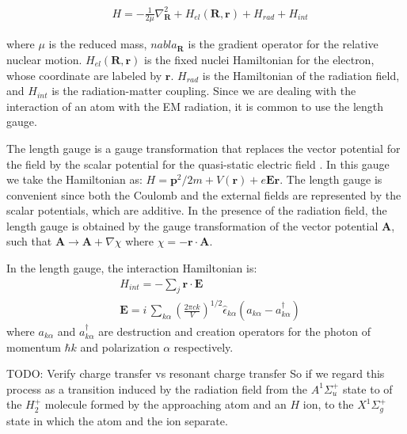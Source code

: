 \begin{equation}\label{eqH} 
\begin{split} 
& H = -\frac{1}{2\mu}\nabla^2_{\mathbf{R}} + H_{el}(\mathbf{R},\mathbf{r}) + H_{rad} + H_{int} 
\end{split} 
\end{equation} 

where $ \mu $ is the reduced mass, $ nabla_{\mathbf{R}} $ is the gradient operator for the relative nuclear motion. $ H_{el}(\mathbf{R},\mathbf{r}) $ is the fixed nuclei Hamiltonian for the electron, whose coordinate are labeled by $ \mathbf{r} $. $ H_{rad} $ is the Hamiltonian of the radiation field, and $ H_{int} $ is the radiation-matter coupling. Since we are dealing with the interaction of an atom with the EM radiation, it is common to use the length gauge.  

The length gauge is a gauge transformation that replaces the vector potential for the field by the scalar potential for the quasi-static electric field \cite{LengthGauge3}.  In this gauge we take the Hamiltonian as: $ H = \mathbf{p}^2/2m + V(\mathbf{r})  + e\mathbf{E}\mathbf{r} $. The length gauge is convenient since both the Coulomb and the external fields are represented by the scalar potentials, which are additive. In the presence of the radiation field, the length gauge is obtained by the gauge transformation of the vector potential $ \mathbf{A} $, such that $ \mathbf{A} \rightarrow \mathbf{A} + \nabla \chi $ where $ \chi = - \mathbf{r} \cdot \mathbf{A} $. 

In the length gauge, the interaction Hamiltonian is:
\begin{equation}
\begin{split}
& H_{int} = -\sum_j{ \mathbf{r}\cdot\mathbf{E} } \\[.8em]
& \mathbf{E} = i\,\sum_{k\alpha}{\left(\frac{2\pi c k}{V}\right)^{1/2}\hat{\epsilon}_{k\alpha}\left(a_{k\alpha} - a^{\dagger}_{k\alpha}\right)}
\end{split}
\end{equation}
where $ a_{k\alpha} $ and $ a^{\dagger}_{k\alpha} $ are destruction and creation operators for the photon of momentum $ \hbar k $ and polarization $ \alpha $ respectively.

TODO: Verify charge transfer vs resonant charge transfer
So if we regard this process as a transition induced by the radiation field from the $ A^{1}\Sigma^{+}_u $ state to of the $ H_2^{+} $ molecule formed by the approaching atom and an $ H $ ion, to the $ X^{1}\Sigma^{+}_g $ state in which the atom and the ion separate.

